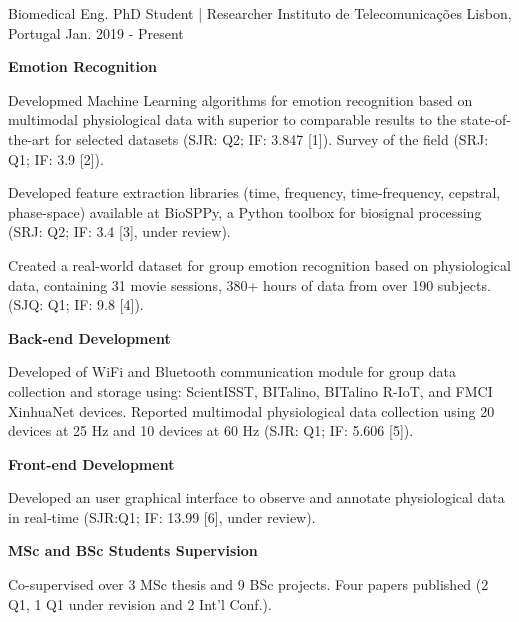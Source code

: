 

\begin{cventries}

  \cventry
    {Biomedical Eng. PhD Student | Researcher} %
    {Instituto de Telecomunicações} %
    {Lisbon, Portugal} %
    {Jan. 2019 - Present} %
    {
      \begin{cvitems} %
        \item[]\textbf{Emotion Recognition}
        \item{Developmed Machine Learning algorithms for emotion recognition based on multimodal physiological data with superior to comparable results to the state-of-the-art for selected datasets (SJR: Q2; IF: 3.847 [1]). Survey of the field (SRJ: Q1; IF: 3.9 [2]).}
        \item {Developed feature extraction libraries (time, frequency, time-frequency, cepstral, phase-space) available at BioSPPy, a Python toolbox for biosignal processing (SRJ: Q2; IF: 3.4 [3], under review).}
        \item {Created a real-world dataset for group emotion recognition based on physiological data, containing 31 movie sessions, 380+ hours of data from over 190 subjects. (SJQ: Q1; IF: 9.8 [4]).}
        \item[] \textbf{Back-end Development}
        \item {Developed of WiFi and Bluetooth communication module for group data collection and storage using: ScientISST, BITalino, BITalino R-IoT, and FMCI XinhuaNet devices. Reported multimodal physiological data collection using 20 devices at 25 Hz and 10 devices at 60 Hz (SJR: Q1; IF: 5.606 [5]).}
        \item[] \textbf{Front-end Development}
        \item {Developed an user graphical interface to observe and annotate physiological data in real‑time (SJR:Q1; IF: 13.99 [6], under review).} 
        \item[]\textbf {MSc and BSc Students Supervision}
        \item {Co-supervised over 3 MSc thesis and 9 BSc projects. Four papers published (2 Q1, 1 Q1 under revision and 2 Int'l Conf.).}

\end{cvitems}}
\end{cventries}
